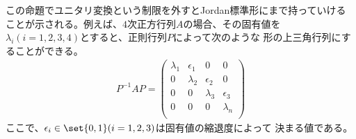 {	この命題でユニタリ変換という制限を外すとJordan標準形にまで持っていける
	ことが示される。例えば、$4$次正方行列$A$の場合、その固有値を
	$\lambda_i(i=1,2,3,4)$とすると、正則行列$P$によって次のような
	形の上三角行列にすることができる。
	\begin{equation*}\begin{split}
		P^{-1}AP = 	\begin{pmatrix}
			\lambda_1 & \epsilon_1 & 0 & 0 \\
			0 & \lambda_2 & \epsilon_2 & 0 \\
			0 & 0 & \lambda_3 & \epsilon_3 \\
			0 & 0 & 0 & \lambda_n \\
		\end{pmatrix}
	\end{split}\end{equation*}
	ここで、$\epsilon_i\in\set{0,1}(i=1,2,3)$は固有値の縮退度によって
	決まる値である。
}\endgroup %
